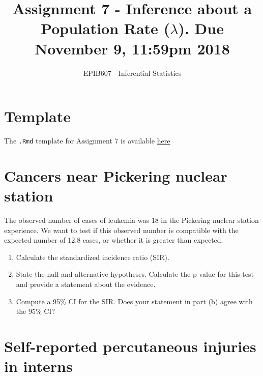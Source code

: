 \documentclass[letterpaper,9pt,twoside,printwatermark=false]{pinp}
\title{Assignment 7 - Inference about a Population Rate (\(\lambda\)). Due
November 9, 11:59pm 2018}
\author[a]{EPIB607 - Inferential Statistics}
\affil[a]{Fall 2018, McGill University}
\providecommand{\tightlist}{%
  \setlength{\itemsep}{0pt}\setlength{\parskip}{0pt}}
\begin{document}
\verticaladjustment{-2pt}

\maketitle
\thispagestyle{firststyle}



\section*{Template}\label{template}

The \texttt{.Rmd} template for Assignment 7 is available
\href{https://github.com/sahirbhatnagar/EPIB607/raw/master/assignments/a7/a7_template.Rmd}{here}

\section{Cancers near Pickering nuclear
station}\label{cancers-near-pickering-nuclear-station}

The observed number of cases of leukemia was 18 in the Pickering nuclear
station experience. We want to test if this observed number is
compatible with the expected number of 12.8 cases, or whether it is
greater than expected.

\begin{enumerate}
\def\labelenumi{\alph{enumi}.}
\tightlist
\item
  Calculate the standardized incidence ratio (SIR).
\item
  State the null and alternative hypotheses. Calculate the p-value for
  this test and provide a statement about the evidence.
\item
  Compute a 95\% CI for the SIR. Does your statement in part (b) agree
  with the 95\% CI?
\end{enumerate}

\section{Self-reported percutaneous injuries in
interns}\label{self-reported-percutaneous-injuries-in-interns}
\end{document}
